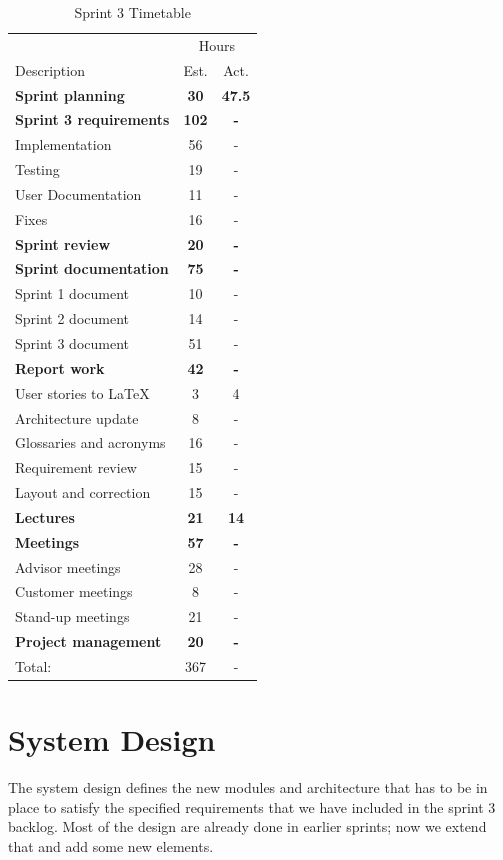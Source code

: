 \begin{table}[!htb] \small \center
\caption{Sprint 3 Timetable\label{tab:sprint3time}}
\begin{tabularx}{\textwidth}{X c c}
	\toprule
	& \multicolumn{2}{c}{Hours} \\
	\cmidrule(r){2-3}
	Description & Est. & Act. \\
	\midrule
	\textbf{Sprint planning} & \textbf{30} & \textbf{47.5} \\
	\addlinespace
	\textbf{Sprint 3 requirements} & \textbf{102} & \textbf{-} \\
	Implementation & 56 & - \\
	Testing & 19 & - \\
	User Documentation & 11 & - \\
	Fixes & 16 & - \\
	\addlinespace
	\textbf{Sprint review} & \textbf{20} & \textbf{-} \\
	\addlinespace
	\textbf{Sprint documentation} & \textbf{75} & \textbf{-} \\
	Sprint 1 document & 10 & -\\
	Sprint 2 document & 14 & - \\
	Sprint 3 document & 51 & - \\
	\addlinespace
	\textbf{Report work} & \textbf{42} & \textbf{-} \\
	User stories to LaTeX & 3 & 4\\
	Architecture update & 8 & -\\
	Glossaries and acronyms & 16 & -\\
	Requirement review & 15 & -\\
	Layout and correction & 15 & -\\
	\addlinespace
	\textbf{Lectures} & \textbf{21} & \textbf{14} \\
	\addlinespace
	\textbf{Meetings} & \textbf{57} & \textbf{-} \\
	Advisor meetings & 28 & - \\
	Customer meetings & 8 & - \\
	Stand-up meetings & 21 & - \\
	\textbf{Project management} & \textbf{20} & \textbf{-} \\
	\midrule
	Total: & 367 & - \\
	\bottomrule
\end{tabularx}
\end{table}



\section{System Design}
The system design defines the new modules and architecture that has to be in place to satisfy the specified requirements that we have included in the sprint 3 backlog. Most of the design are already done in earlier sprints; now we extend that and add some new elements.

